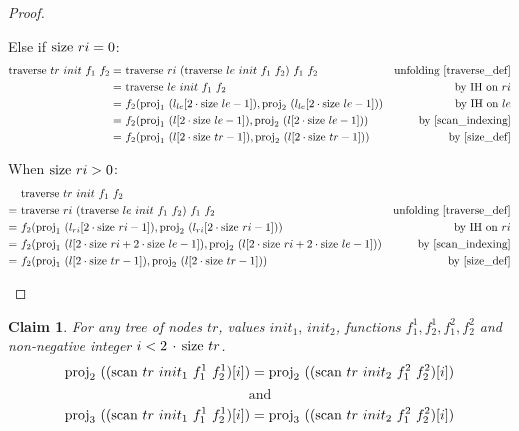 \documentclass{article}
\newtheorem{claim}[lemma]{Claim}
\newcommand{\textfun}[1]{\textup{#1}}
\newcommand{\longtraverse}[4]{\textfun{traverse}\ #1\ #2\ #3 \ #4}
\newcommand{\longscan}[4]{\textfun{scan}\ #1\ #2\ #3 \ #4}
\newcommand{\size}[1]{\textfun{size}\ #1}
\newcommand{\fst}[1]{\textfun{proj}_1\ #1}
\newcommand{\snd}[1]{\textfun{proj}_2\ #1}
\newcommand{\trd}[1]{\textfun{proj}_3\ #1}
\begin{document}
\begin{proof}
\begin{itemize}
\begin{itemize}
            
            Else if $\size{ri} = 0$:
            \begin{align*}
                \longtraverse{tr}{init}{f_1}{f_2}
                =\ & \longtraverse{ri}{(\longtraverse{le}{init}{f_1}{f_2})}{f_1}{f_2} &\text{unfolding \cref{traverse_def}} \\
                =\ & \longtraverse{le}{init}{f_1}{f_2} & \text{by IH on $ri$} \\
                =\ &  f_2(\fst{(l_{le}[2 \cdot \size{le} - 1])}, \snd{(l_{le}[2 \cdot \size{le} - 1])}) & \text{by IH on $le$} \\
                =\ &  f_2(\fst{(l[2 \cdot \size{le} - 1])}, \snd{(l[2 \cdot \size{le} - 1])}) & \text{by \cref{scan_indexing}} \\
                =\ &  f_2(\fst{(l[2 \cdot \size{tr} - 1])}, \snd{(l[2 \cdot \size{tr} - 1])}) & \text{by \cref{size_def}}
            \end{align*}

            When $\size{ri} > 0$:
            \begin{align*}
                &\longtraverse{tr}{init}{f_1}{f_2} \\
                =\ & \longtraverse{ri}{(\longtraverse{le}{init}{f_1}{f_2})}{f_1}{f_2} &\text{unfolding \cref{traverse_def}} \\
                =\ &  f_2(\fst{(l_{ri}[2 \cdot \size{ri} - 1])}, \snd{(l_{ri}[2 \cdot \size{ri} - 1])}) & \text{by IH on $ri$} \\
                =\ &  f_2(\fst{(l[2 \cdot \size{ri} + 2 \cdot \size{le} - 1])}, \snd{(l[2 \cdot \size{ri} + 2 \cdot \size{le} - 1])}) & \text{by \cref{scan_indexing}} \\
                =\ &  f_2(\fst{(l[2 \cdot \size{tr} - 1])}, \snd{(l[2 \cdot \size{tr} - 1])}) & \text{by \cref{size_def}}
            \end{align*}
    \end{itemize}
\end{itemize}

\end{proof}

\begin{claim}
    \label{scan_indexing_node}
    For any tree of nodes $tr$, values $init_1,\, init_2$, functions $f^1_1, f^1_2, f^2_1, f^2_2$ and non-negative integer $i < 2\, \cdot\, \size{tr}$.
    \[ \snd{((\longscan{tr}{init_1}{f^1_1}{f^1_2})[i])} = \snd{((\longscan{tr}{init_2}{f^2_1}{f^2_2})[i])}\]
    \[\text{and}\]
    \[ \trd{((\longscan{tr}{init_1}{f^1_1}{f^1_2})[i])} = \trd{((\longscan{tr}{init_2}{f^2_1}{f^2_2})[i])}\]
\end{claim}
\end{document}

